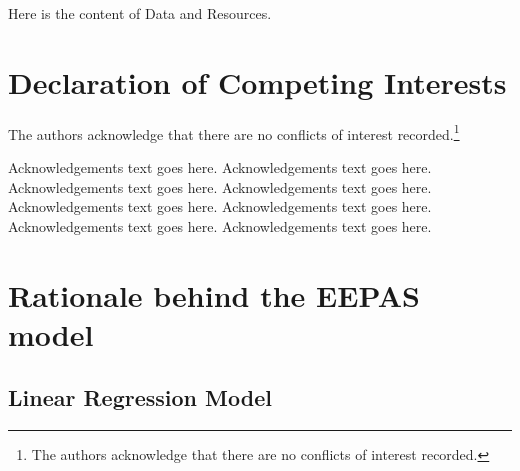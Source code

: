 \documentclass[linenum,doublespace,onecolumn]{SSA-SRL}
\theoremstyle{lemma}
\begin{document}
\begin{datres}%
Here is the content of Data and Resources.
\end{datres}


\section{Declaration of Competing Interests}

The authors acknowledge that there are no conflicts of interest recorded.\footnote{The authors acknowledge that there are no conflicts of interest recorded.}

\begin{ack}%
Acknowledgements text goes here. Acknowledgements text goes here. Acknowledgements text goes here. Acknowledgements text goes here. Acknowledgements text goes here. Acknowledgements text goes here. Acknowledgements text goes here. Acknowledgements text goes here.
\end{ack}



\clearpage
\newpage


\renewcommand{\figurename}{Supplementary Fig.}
\renewcommand{\tablename}{Supplementary Table}
\renewcommand{\theequation}{S.\arabic{equation}}

\appendix


\setcounter{figure}{0}  
\setcounter{table}{0} 
\setcounter{page}{1}
\setcounter{equation}{0}

\setcounter{secnumdepth}{1}

\renewcommand{\thepage}{S\arabic{page}}
\section{Rationale behind the EEPAS model} \label{sec:derive_eepas_model}

\subsection{Linear Regression Model}
\end{document}
